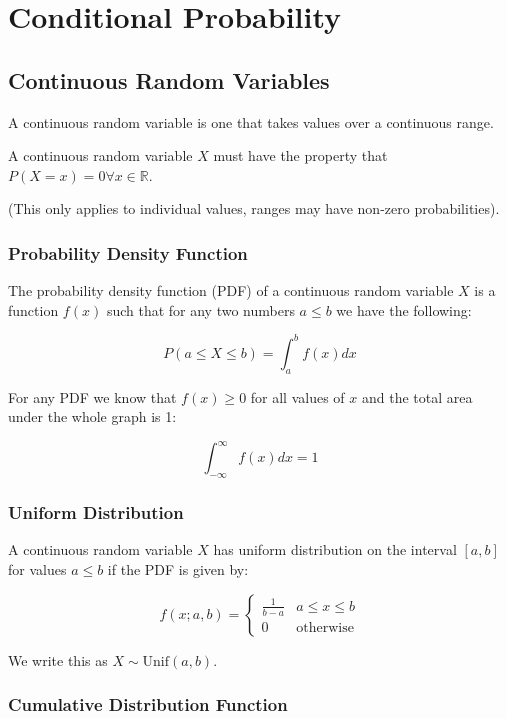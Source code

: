 \section*{Conditional Probability}

\subsection*{Continuous Random Variables}

A continuous random variable is one that takes values over a continuous range.

A continuous random variable $X$ must have the property that $P(X=x)=0 \forall x \in \mathbb{R}$.

(This only applies to individual values, ranges may have non-zero probabilities).

\subsubsection*{Probability Density Function}

The probability density function (PDF) of a continuous random variable $X$ is a function $f(x)$ such that for any two numbers $a\leq b$ we have the following:

$$ P(a \leq X \leq b) = \int_a^b f(x) dx $$

For any PDF we know that $f(x) \geq 0$ for all values of $x$ and the total area under the whole graph is 1:

$$ \int_{-\infty}^{\infty} f(x) dx = 1 $$

\subsubsection*{Uniform Distribution}

A continuous random variable $X$ has uniform distribution on the interval $[a,b]$ for values $a \leq b$ if the PDF is given by:

$$ f(x; a,b) = \begin{cases} \frac{1}{b-a} & a \leq x \leq b \\ 0 & \text{otherwise} \end{cases} $$

We write this as $X \sim \text{Unif}(a,b)$.

\subsubsection*{Cumulative Distribution Function}

